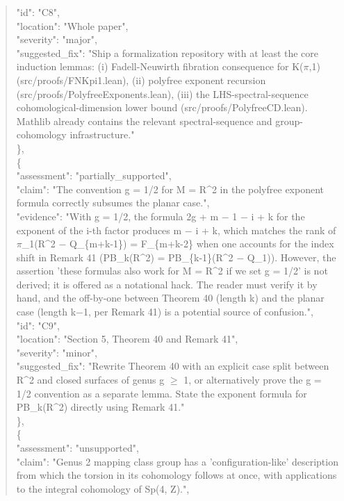 \documentclass[11pt]{article}
\begin{document}
\begin{quote}
      "id": "C8",\\
      "location": "Whole paper",\\
      "severity": "major",\\
      "suggested\_fix": "Ship a formalization repository with at least the core induction lemmas: (i) Fadell-Neuwirth fibration consequence for K(\ensuremath{\pi},1) (src/proofs/FNKpi1.lean), (ii) polyfree exponent recursion (src/proofs/PolyfreeExponents.lean), (iii) the LHS-spectral-sequence cohomological-dimension lower bound (src/proofs/PolyfreeCD.lean). Mathlib already contains the relevant spectral-sequence and group-cohomology infrastructure."\\
    \},\\
    \{\\
      "assessment": "partially\_supported",\\
      "claim": "The convention g = 1/2 for M = R\^{}2 in the polyfree exponent formula correctly subsumes the planar case.",\\
      "evidence": "With g = 1/2, the formula 2g + m \ensuremath{-} 1 \ensuremath{-} i + k for the exponent of the i-th factor produces m \ensuremath{-} i + k, which matches the rank of \ensuremath{\pi}\_1(R\^{}2 \ensuremath{-} Q\_\{m+k-1\}) = F\_\{m+k-2\} when one accounts for the index shift in Remark 41 (PB\_k(R\^{}2) = PB\_\{k-1\}(R\^{}2 \ensuremath{-} Q\_1)). However, the assertion 'these formulas also work for M = R\^{}2 if we set g = 1/2' is not derived; it is offered as a notational hack. The reader must verify it by hand, and the off-by-one between Theorem 40 (length k) and the planar case (length k\ensuremath{-}1, per Remark 41) is a potential source of confusion.",\\
      "id": "C9",\\
      "location": "Section 5, Theorem 40 and Remark 41",\\
      "severity": "minor",\\
      "suggested\_fix": "Rewrite Theorem 40 with an explicit case split between R\^{}2 and closed surfaces of genus g \ensuremath{\ge} 1, or alternatively prove the g = 1/2 convention as a separate lemma. State the exponent formula for PB\_k(R\^{}2) directly using Remark 41."\\
    \},\\
    \{\\
      "assessment": "unsupported",\\
      "claim": "Genus 2 mapping class group has a 'configuration-like' description from which the torsion in its cohomology follows at once, with applications to the integral cohomology of Sp(4, Z).",\\

\end{quote}
\end{document}
